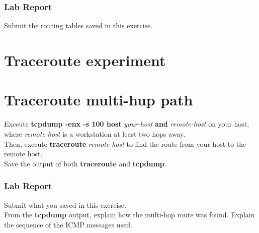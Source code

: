 \documentclass[10pt,a4paper]{article}
\numberwithin{equation}{section}
\numberwithin{figure}{section}
\numberwithin{table}{section}
\begin{document}
    \subsubsection*{Lab Report}
    Submit the routing tables saved in this exercise.


\section*{Traceroute experiment}
\section{Traceroute multi-hup path}
    Execute \textbf{tcpdump -enx -s 100 host} \textit{your-host} \textbf{and} \textit{remote-host} on your host, where \textit{remote-host} is a workstation at least two hops away. \\
    Then, execute \textbf{traceroute} \textit{remote-host} to find the route from your host to the remote host. \\
    Save the output of both \textbf{traceroute} and \textbf{tcpdump}.

    \subsubsection*{Lab Report}
    Submit what you saved in this exercise. \\
    From the \textbf{tcpdump} output, explain how the multi-hop route was found.
    Explain the sequence of the ICMP messages used.
\end{document}
